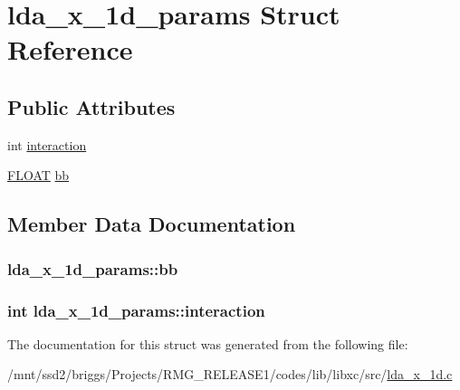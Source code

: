 \hypertarget{structlda__x__1d__params}{\section{lda\-\_\-x\-\_\-1d\-\_\-params Struct Reference}
\label{structlda__x__1d__params}
}
\subsection*{Public Attributes}
\begin{DoxyCompactItemize}
\item 
int \hyperlink{structlda__x__1d__params_a9eefa5b46217bc64bb8c2013a51f0ab3}{interaction}
\item 
\hyperlink{src_2xc__config_8h_ae8690abbffa85934d64d545920e2b108}{F\-L\-O\-A\-T} \hyperlink{structlda__x__1d__params_a2138a810f11b9c517b4786028ed8c5aa}{bb}
\end{DoxyCompactItemize}


\subsection{Member Data Documentation}
\hypertarget{structlda__x__1d__params_a2138a810f11b9c517b4786028ed8c5aa}{
\subsubsection[{bb}]{ lda\-\_\-x\-\_\-1d\-\_\-params\-::bb}}\label{structlda__x__1d__params_a2138a810f11b9c517b4786028ed8c5aa}
\hypertarget{structlda__x__1d__params_a9eefa5b46217bc64bb8c2013a51f0ab3}{
\subsubsection[{interaction}]{\setlength{\rightskip}{0pt plus 5cm}int lda\-\_\-x\-\_\-1d\-\_\-params\-::interaction}}\label{structlda__x__1d__params_a9eefa5b46217bc64bb8c2013a51f0ab3}


The documentation for this struct was generated from the following file\-:\begin{DoxyCompactItemize}
\item 
/mnt/ssd2/briggs/\-Projects/\-R\-M\-G\-\_\-\-R\-E\-L\-E\-A\-S\-E1/codes/lib/libxc/src/\hyperlink{lda__x__1d_8c}{lda\-\_\-x\-\_\-1d.\-c}\end{DoxyCompactItemize}
